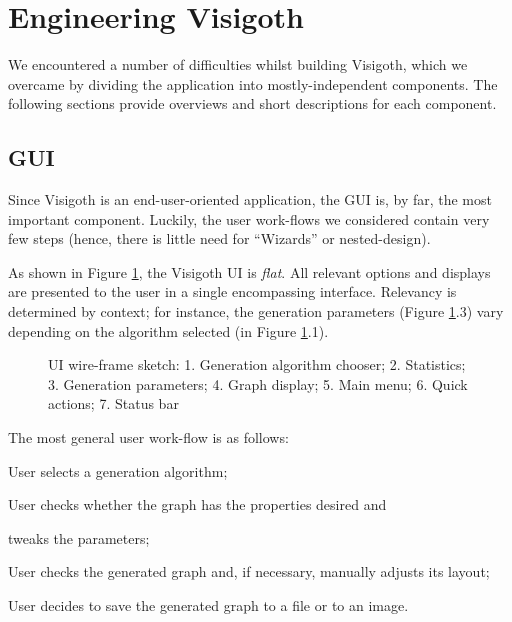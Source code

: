 \documentclass[a4paper,11pt,titlepage]{article}
\let\stdsection\section         %
\renewcommand{\section}{\newpage\stdsection}
\begin{document}
\section{Engineering Visigoth}

We encountered a number of difficulties whilst building Visigoth,
which we overcame by dividing the application into mostly-independent
components. The following sections provide overviews and short
descriptions for each component.

\subsection{GUI}
\label{gui}

Since Visigoth is an end-user-oriented application, the GUI is, by
far, the most important component. Luckily, the user work-flows we
considered contain very few steps (hence, there is little need for
``Wizards'' or nested-design).

As shown in Figure \ref{fig:gui-sketch}, the Visigoth UI is
\emph{flat}. All relevant options and displays are presented to the
user in a single encompassing interface. Relevancy is determined by
context; for instance, the generation parameters (Figure
\ref{fig:gui-sketch}.3) vary depending on the algorithm selected (in
Figure \ref{fig:gui-sketch}.1).

\begin{figure}[h]
  \centering
  
  \caption{UI wire-frame sketch: 1. Generation algorithm chooser;
    2. Statistics; 3. Generation parameters; 4. Graph display; 5. Main
    menu; 6. Quick actions; 7. Status bar}
  \label{fig:gui-sketch}
\end{figure}

\noindent The most general user work-flow is as follows:
\begin{description}
  \setlength{\itemindent}{\parindent}
  \item [Figure \ref{fig:gui-sketch}.1] User selects a generation
    algorithm;
  \item [Figure \ref{fig:gui-sketch}.2] User checks whether the graph
    has the properties desired and
  \item [Figure \ref{fig:gui-sketch}.3] tweaks the parameters;
  \item [Figure \ref{fig:gui-sketch}.4] User checks the generated
    graph and, if necessary, manually adjusts its layout;
  \item [Figure \ref{fig:gui-sketch}.5, 6] User decides to save the
    generated graph to a file or to an image.
\end{description}
\end{document}
